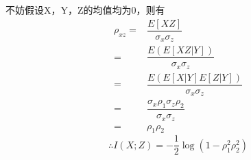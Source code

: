 \documentclass[UTF8]{ctexart}
\begin{document}
不妨假设X，Y，Z的均值均为0，则有
\begin{equation*}
    \begin{split}
        \rho_{xz}=&\dfrac{E[XZ]}{\sigma_x \sigma_z}\\
        =& \dfrac{E(E[XZ|Y])}{\sigma_x \sigma_z}\\
        =& \dfrac{E(E[X|Y]E[Z|Y])}{\sigma_x \sigma_z}\\
        =& \dfrac{\sigma _x\rho_1\sigma_z\rho_2}{\sigma_x \sigma_z}\\
        =& \rho_1\rho_2
    \end{split}
\end{equation*}
$$\therefore I(X;Z)=-\frac{1}{2}\log (1-\rho_1^2\rho_2^2)$$
\end{document}
